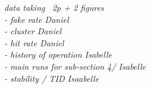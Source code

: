 {\it data taking ~2p + 2 figures\\
     - fake rate  Daniel\\
     - cluster  Daniel\\
     - hit rate  Daniel\\
     - history of operation  Isabelle\\
     - main runs for sub-section 4/  Isabelle \\
     - stability / TID Isaabelle
}
